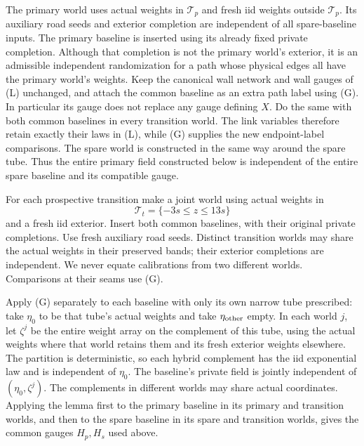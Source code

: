 The primary world uses actual weights in $\mathcal T_p$ and fresh iid
weights outside $\mathcal T_p$. Its auxiliary road seeds and exterior
completion are independent of all spare-baseline inputs. The primary
baseline is inserted using its already fixed private completion.
Although that completion is not the primary world's exterior, it is
an admissible independent randomization for a path whose physical
edges all have the primary world's weights. Keep the canonical wall
network and wall gauges of (L) unchanged, and attach the common
baseline as an extra path label using (G). In particular its gauge
does not replace any gauge defining $X$. Do the same with both
common baselines in every transition world. The link variables
therefore retain exactly their laws in (L), while (G) supplies the
new endpoint-label comparisons. The spare world is
constructed in the same way around the spare tube. Thus the entire
primary field constructed below is independent of the entire spare
baseline and its compatible gauge.

For each prospective transition make a joint world using actual
weights in
\[
 \mathcal T_t=\{-3s\leq z\leq13s\}
\]
and a fresh iid exterior. Insert both common baselines, with their
original private completions. Use fresh auxiliary road seeds. Distinct
transition worlds may share the actual weights in their preserved
bands; their exterior completions are independent. We never equate
calibrations from two different worlds. Comparisons at their seams
use (G).

Apply (G) separately to each baseline with only its own narrow tube
prescribed: take $\eta_0$ to be that tube's actual weights and take
$\eta_{\rm other}$ empty. In each world $j$, let $\zeta^j$ be the entire
weight array on the complement of this tube, using the actual weights
where that world retains them and its fresh exterior weights elsewhere.
The partition is deterministic, so each hybrid complement has the iid
exponential law and is independent of $\eta_0$. The baseline's private
field is jointly independent of $(\eta_0,\zeta^j)$. The complements in
different worlds may share actual coordinates. Applying the lemma first
to the primary baseline in its primary and transition worlds, and then
to the spare baseline in its spare and transition worlds, gives the
common gauges $H_p,H_s$ used above.

